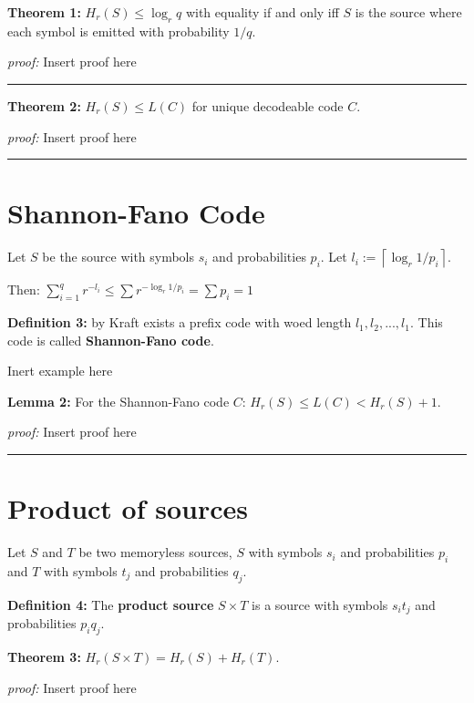 \documentclass{article}
\begin{document}
\noindent \textbf{Theorem  1:}  $H_{r}(S) \leq \log_{r}{q}$ with equality if and only iff $S$ is the source where each symbol is emitted with probability $1/q$.

\noindent\textit{proof:}  Insert proof here

\noindent
{\color{gray} \rule{\linewidth}{0.5mm} }

\noindent \textbf{Theorem  2:}  $H_{r}(S) \leq L(C)$ for unique decodeable code $C$.

\noindent\textit{proof:}  Insert proof here

\noindent
{\color{gray} \rule{\linewidth}{0.5mm} }


	\section{Shannon-Fano Code}

\noindent Let $S$ be the source with symbols $s_i$ and probabilities $p_i$. Let $l_i := \left\lceil \log_{r}{1/p_i} \right\rceil$. 


\noindent Then: $\sum_{i = 1}^{q}{r^{-l_i}} \leq \sum r^{- \log_{r}{1/p_i}} = \sum p_i = 1$

\noindent \textbf{Definition 	3:} by Kraft exists a prefix code with woed length $l_1, l_2, ..., l_1$. This code is called \textbf{Shannon-Fano code}.

Inert example here


\noindent \textbf{Lemma 	2:}  For the Shannon-Fano code $C$: $H_{r}(S) \leq L(C) < H_{r}(S) + 1$.

\noindent\textit{proof:}  Insert proof here

\noindent
{\color{gray} \rule{\linewidth}{0.5mm} }



	\section{Product of sources}
	
\noindent Let $S$ and $T$ be two memoryless sources, $S$ with symbols $s_i$ and probabilities $p_i$ and $T$ with symbols $t_j$ and probabilities $q_j$.

\noindent \textbf{Definition 	4:} The \textbf{product source} $S \times T$ is a source with symbols $s_{i}t_{j}$ and probabilities $p_{i}q_{j}$.

\noindent \textbf{Theorem  3:} $H_{r}(S \times T) = H_{r} (S) + H_{r} (T)$.

\noindent\textit{proof:}  Insert proof here
\end{document}

